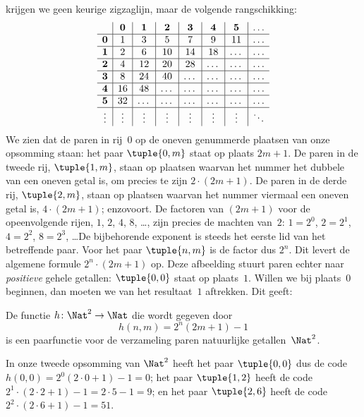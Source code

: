 \documentclass[openany]{memoir}
\begin{document}
\begin{explain}
krijgen we geen keurige zigzaglijn, maar de volgende rangschikking:
\[
\begin{array}{ c | c | c | c | c | c | c | c }
& \mathbf 0 & \mathbf 1 & \mathbf 2 & \mathbf 3 & \mathbf 4 & \mathbf 5 & \dots \\
\hline
\mathbf 0 & 1 & 3 & 5 & 7 & 9 & 11 & \dots \\
\hline
\mathbf 1 & 2 & 6 & 10 & 14 & 18 & \dots & \dots \\
\hline
\mathbf 2 & 4 & 12 & 20 & 28 & \dots & \dots & \dots \\
\hline
\mathbf 3 & 8 & 24 & 40 & \dots & \dots & \dots & \dots \\
\hline
\mathbf 4 & 16 & 48 & \dots & \dots & \dots & \dots & \dots \\
\hline
\mathbf 5 & 32 & \dots & \dots & \dots & \dots & \dots & \dots \\
\hline
\vdots & \vdots & \vdots & \vdots & \vdots & \vdots & \vdots & \ddots\\
\end{array}
\]
We zien dat de paren in rij~$0$ op de oneven genummerde plaatsen van onze
opsomming staan: het paar $\tuple{0,m}$ staat op plaats $2m+1$. De paren in
de tweede rij, $\tuple{1,m}$, staan op plaatsen waarvan het nummer het dubbele
van een oneven getal is, om precies te zijn $2 \cdot (2m+1)$. De paren in de
derde rij, $\tuple{2,m}$, staan op plaatsen waarvan het nummer viermaal een
oneven getal is, $4 \cdot (2m+1)$; enzovoort. De factoren van $(2m+1)$ voor
de opeenvolgende rijen, $1$, $2$, $4$, $8$, \dots, zijn precies de machten
van~$2$: $1= 2^0$, $2 = 2^1$, $4 = 2^2$, $8 = 2^3$, \dots\@ De bijbehorende
exponent is steeds het eerste lid van het betreffende paar. Voor het paar
$\tuple{n,m}$ is de factor dus $2^n$. Dit levert de algemene formule
$2^n \cdot (2m+1)$ op. Deze afbeelding stuurt paren echter naar
\emph{positieve} gehele getallen: $\tuple{0,0}$ staat op plaats~$1$. Willen we
bij plaats~$0$ beginnen, dan moeten we van het resultaat~$1$ aftrekken. Dit
geeft:
\end{explain}

\begin{ex}
De functie $h\colon \Nat^2 \to \Nat$ die wordt gegeven door
\[
h(n,m) = 2^n (2m+1) - 1
\]
is een paarfunctie voor de verzameling paren natuurlijke getallen~$\Nat^2$.
\end{ex}

\begin{explain}
In onze tweede opsomming van $\Nat^2$ heeft het paar $\tuple{0,0}$ dus de code
$h(0,0) = 2^0(2\cdot 0+1) - 1 = 0$; het paar $\tuple{1,2}$ heeft de code
$2^{1} \cdot (2 \cdot 2 + 1) - 1 = 2 \cdot 5 - 1 = 9$; en het paar
$\tuple{2,6}$ heeft de code $2^{2} \cdot (2 \cdot 6 + 1) - 1 = 51$.
\end{explain}
\end{document}
